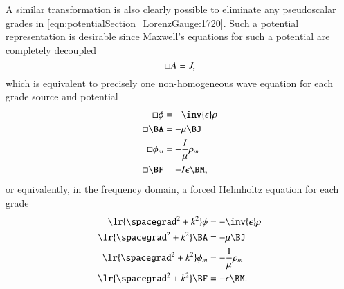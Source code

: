A similar transformation is also clearly possible to eliminate any pseudoscalar grades in \cref{eqn:potentialSection_LorenzGauge:1720}.
Such a potential representation is desirable since
Maxwell's equations for such a potential are completely decoupled
\begin{dmath}\label{eqn:potentialSection_LorenzGauge:1760}
\dLambertian
A = J,
\end{dmath}
which is equivalent to precisely one non-homogeneous wave equation for each grade source and potential
\begin{dmath}\label{eqn:potentialSection_LorenzGauge:1600}
\begin{aligned}
\dLambertian
\phi &= - \inv{\epsilon} \rho \\
\dLambertian
\BA &= - \mu \BJ \\
\dLambertian
\phi_m &= - \frac{I}{\mu} \rho_m \\
\dLambertian
\BF &= - I \epsilon \BM,
\end{aligned}
\end{dmath}
or equivalently, in the frequency domain, a forced Helmholtz equation for each grade
\begin{dmath}\label{eqn:potentialSection_LorenzGauge:1780}
\begin{aligned}
\lr{ \spacegrad^2 + k^2 } \phi &= - \inv{\epsilon} \rho \\
\lr{ \spacegrad^2 + k^2 } \BA &= - \mu \BJ \\
\lr{ \spacegrad^2 + k^2 } \phi_m &= - \frac{1}{\mu} \rho_m \\
\lr{ \spacegrad^2 + k^2 } \BF &= - \epsilon \BM.
\end{aligned}
\end{dmath}
